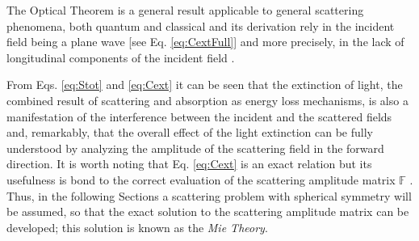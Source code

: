 %
%
%
\noindent The Optical Theorem is a general result applicable to general scattering phenomena, both quantum and classical  \cite{bohren_absorption_1983,newton_optical_1976} and its derivation rely in the incident field being a plane wave [see Eq. \eqref{eq:CextFull}] and more precisely, in the lack of longitudinal components of the incident field \cite{krasavin_generalization_2018,born_max_principle_1999}.

From Eqs. \eqref{eq:Stot} and  \eqref{eq:Cext} it can be seen that the extinction of light, the combined result of scattering and absorption as energy loss mechanisms, is also a manifestation of the interference between the incident and the scattered fields and, remarkably,  that the overall effect of the light extinction can be fully understood by analyzing the  amplitude of the scattering field in the forward direction.  It is worth noting that Eq. \eqref{eq:Cext} is an exact relation but its usefulness is bond to the correct evaluation of the scattering amplitude matrix $\mathbb{F}$ \cite{tsang_scattering_2000}. Thus, in the following Sections a scattering problem with spherical symmetry will be assumed, so that the exact solution to the scattering amplitude matrix can be developed; this solution is known as the \emph{Mie Theory}.
